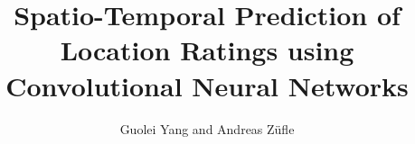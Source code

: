 \documentclass{llncs}
\begin{document}
\title{Spatio-Temporal Prediction of Location Ratings using Convolutional Neural Networks}

\author{Guolei Yang and Andreas Z\"ufle}

\maketitle





\begin{abstract}

\end{abstract}









%




%


\tiny{ } %
%
%
\end{document}
